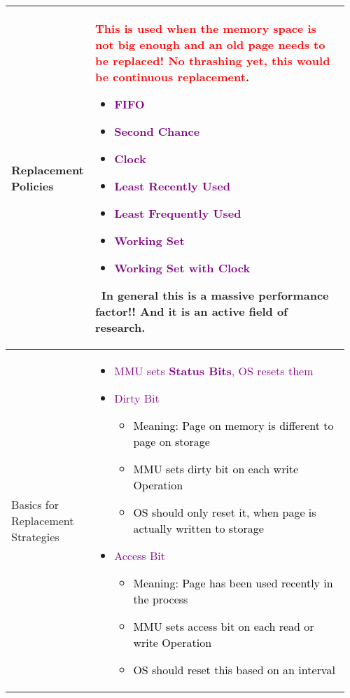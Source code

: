 \documentclass[main.tex,fontsize=8pt,paper=a4,paper=portrait,DIV=calc,]{scrartcl}
\begin{document}
\begin{table}[ht!]
\begin{tabular}{|m{0.2\linewidth}|m{0.755\linewidth}|}
\hline
Replacement Policies & 
\textcolor{red}{This is used when the memory space is not big enough and an old page needs to be replaced! \textbf{No thrashing yet, this would be continuous replacement}}.\newline
\begin{itemize}
\item \textcolor{purple}{FIFO}
\item \textcolor{purple}{Second Chance}
\item \textcolor{purple}{Clock}
\item \textcolor{purple}{Least Recently Used}
\item \textcolor{purple}{Least Frequently Used}
\item \textcolor{purple}{Working Set}
\item \textcolor{purple}{Working Set with Clock}
\vspace{-3mm}
\end{itemize}
\, \newline
In general this is \textbf{a massive performance factor!!} And it is an active field of research.\\
\hline
Basics for Replacement Strategies &
\vspace{2mm}
\begin{itemize}
\item \textcolor{purple}{MMU sets \textbf{Status Bits}, OS resets them}
\item \textcolor{purple}{Dirty Bit}\newline
\begin{itemize}
  \item \textcolor{black}{Meaning: Page on memory is different to page on storage}
\item \textcolor{black}{MMU sets dirty bit on each write Operation}
\item \textcolor{black}{OS should only reset it, when page is actually written to storage}
\end{itemize}
\item \textcolor{purple}{Access Bit}\newline
\begin{itemize}
\item \textcolor{black}{Meaning: Page has been used recently in the process}
\item \textcolor{black}{MMU sets access bit on each read or write Operation}
\item \textcolor{black}{OS should reset this based on an interval}
\end{itemize} 

\end{itemize}
\end{tabular}
\end{table}
\end{document}
